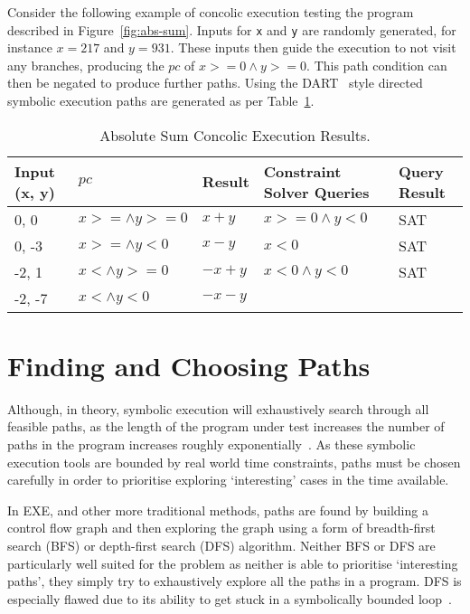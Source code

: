 \documentclass[]{final_report}
\begin{document}
Consider the following example of concolic execution testing the program described in Figure~\ref{fig:abs-sum}. Inputs for \lstinline{x} and \lstinline{y} are randomly generated, for instance $x=217$ and $y=931$. These inputs then guide the execution to not visit any branches, producing the $pc$ of $x >= 0 \land y >=0$. This path condition can then be negated to produce further paths. Using the DART~\cite{godefroid2005dart} style directed symbolic execution paths are generated as per Table~\ref{abs-sum-ce-table}.

\begin{table}[t]
\centering
\begin{tabular}{|l|l|l|l|l|}
\hline
Input (x, y) & $pc$ & Result & Constraint Solver Queries & Query Result \\ \hline
0, 0 & $x >= \land y >= 0$ & $x+y$ & $x >=0 \land y < 0 $ & SAT \\ \hline
0, -3 & $x >= \land y < 0$ & $x - y$ & $x <0 $ & SAT \\ \hline
-2, 1 & $x < \land y >= 0$ & $-x+y$ & $x<0 \land y < 0 $ & SAT \\ \hline
-2, -7 & $x < \land y < 0$ & $-x-y$ &  &  \\ \hline
\end{tabular}
\caption{Absolute Sum Concolic Execution Results.}
\label{abs-sum-ce-table}
\end{table}


\section{Finding and Choosing Paths}

Although, in theory, symbolic execution will exhaustively search through all feasible paths, as the length of the program under test increases the number of paths in the program increases roughly exponentially~\cite{cadar2013symbolic}. As these symbolic execution tools are bounded by real world time constraints, paths must be chosen carefully in order to prioritise exploring `interesting' cases in the time available.

In EXE, and other more traditional methods, paths are found by building a control flow graph and then exploring the graph using a form of breadth-first search (BFS) or depth-first search (DFS) algorithm. Neither BFS or DFS are particularly well suited for the problem as neither is able to prioritise `interesting paths', they simply try to exhaustively explore all the paths in a program. DFS is especially flawed due to its ability to get stuck in a symbolically bounded loop~\cite{cadar2008exe}. 
\end{document}
